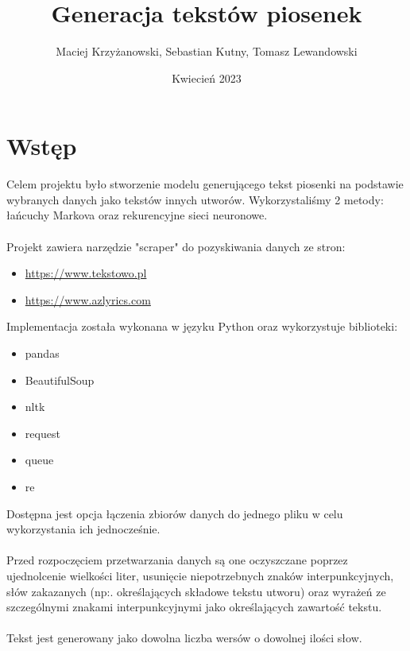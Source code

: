 \documentclass{article}
\title{Generacja tekstów piosenek}
\author{Maciej Krzyżanowski, Sebastian Kutny, Tomasz Lewandowski}
\date{Kwiecień 2023}
\begin{document}
\maketitle

\tableofcontents

\newpage
\section{Wstęp}
Celem projektu było stworzenie modelu generującego tekst piosenki na podstawie wybranych danych jako tekstów innych utworów. Wykorzystaliśmy 2 metody: łańcuchy Markova oraz rekurencyjne sieci neuronowe. \\ \\ Projekt zawiera narzędzie "scraper" do pozyskiwania danych ze stron: 
\begin{itemize}
    \item \url{https://www.tekstowo.pl}
    \item \url{https://www.azlyrics.com}
\end{itemize}
Implementacja została wykonana w języku Python oraz wykorzystuje biblioteki: 
\begin{itemize}
    \item pandas
    \item BeautifulSoup
    \item nltk
    \item request
    \item queue
    \item re
\end{itemize}
Dostępna jest opcja łączenia zbiorów danych do jednego pliku w celu wykorzystania ich jednocześnie. \\ \\
Przed rozpoczęciem przetwarzania danych są one oczyszczane poprzez ujednolcenie wielkości liter, usunięcie niepotrzebnych znaków interpunkcyjnych, słów zakazanych (np:. określających składowe tekstu utworu) oraz wyrażeń ze szczególnymi znakami interpunkcyjnymi jako określających zawartość tekstu.
\\ \\
Tekst jest generowany jako dowolna liczba wersów o dowolnej ilości słow.
\newpage
\end{document}
